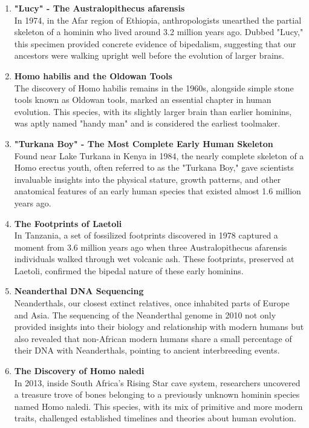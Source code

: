 \documentclass{book}
\begin{document}
\begin{enumerate}
    \item \textbf{"Lucy" - The Australopithecus afarensis} \\
    In 1974, in the Afar region of Ethiopia, anthropologists unearthed the partial skeleton of a hominin who lived around 3.2 million years ago. Dubbed "Lucy," this specimen provided concrete evidence of bipedalism, suggesting that our ancestors were walking upright well before the evolution of larger brains.

    \item \textbf{Homo habilis and the Oldowan Tools} \\
    The discovery of Homo habilis remains in the 1960s, alongside simple stone tools known as Oldowan tools, marked an essential chapter in human evolution. This species, with its slightly larger brain than earlier hominins, was aptly named "handy man" and is considered the earliest toolmaker.

    \item \textbf{"Turkana Boy" - The Most Complete Early Human Skeleton} \\
    Found near Lake Turkana in Kenya in 1984, the nearly complete skeleton of a Homo erectus youth, often referred to as the "Turkana Boy," gave scientists invaluable insights into the physical stature, growth patterns, and other anatomical features of an early human species that existed almost 1.6 million years ago.

    \item \textbf{The Footprints of Laetoli} \\
    In Tanzania, a set of fossilized footprints discovered in 1978 captured a moment from 3.6 million years ago when three Australopithecus afarensis individuals walked through wet volcanic ash. These footprints, preserved at Laetoli, confirmed the bipedal nature of these early hominins.

    \item \textbf{Neanderthal DNA Sequencing} \\
    Neanderthals, our closest extinct relatives, once inhabited parts of Europe and Asia. The sequencing of the Neanderthal genome in 2010 not only provided insights into their biology and relationship with modern humans but also revealed that non-African modern humans share a small percentage of their DNA with Neanderthals, pointing to ancient interbreeding events.

    \item \textbf{The Discovery of Homo naledi} \\
    In 2013, inside South Africa's Rising Star cave system, researchers uncovered a treasure trove of bones belonging to a previously unknown hominin species named Homo naledi. This species, with its mix of primitive and more modern traits, challenged established timelines and theories about human evolution.


\end{enumerate}
\end{document}
